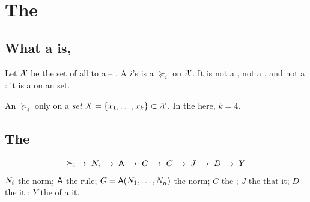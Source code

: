 \section{The }
\label{sec:object}

\subsection{What a   is, }

\begin{definition}[Disposition]
Let $\mathcal{X}$ be the set of all   to a  -- . A
 $i$'s \emph{ } is a   $\succeq_i$
on $\mathcal{X}$. It is not a , not a , and not a : it is a
 on an  set.
\end{definition}

\begin{definition}[Elicitation]
An \emph{}  $\succeq_i$ only on a  \emph{ set}
$X = \{x_1,\dots,x_k\} \subset \mathcal{X}$. In the   here, $k=4$.
\end{definition}

\subsection{The }

\begin{equation}
\succeq_i \;\to\; N_i \;\to\; \mathsf{A} \;\to\; G \;\to\; C \;\to\; J \;\to\; D \;\to\; Y
\label{eq:chain}
\end{equation}
\noindent
$N_i$ the   norm; $\mathsf{A}$ the  rule; $G=\mathsf{A}(N_1,\dots,N_n)$
the  norm; $C$ the  ; $J$ the  that  it;
$D$ the  it ; $Y$ the  of a    it.

